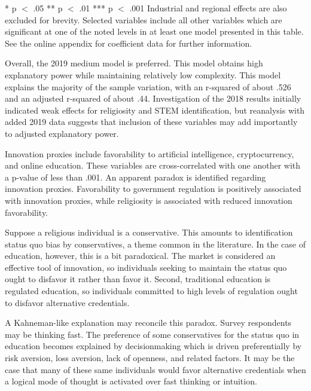 \documentclass[AER]{./aea-latex-templates/AEA}
\begin{document}
\begin{table}
\begin{tabular}{lllll}
            \end{tabular}
            \begin{tablenotes}
                * p $<$ .05
                ** p $<$ .01
                *** p $<$ .001
                Industrial and regional effects are also excluded for brevity.
                Selected variables include all other variables which are significant at one of the noted levels in at least one model presented in this table.
                See the online appendix for coefficient data for further information.
            \end{tablenotes}
            \label{tab:models}
            \end{table}
        
        Overall, the 2019 medium model is preferred. This model obtains high explanatory power while maintaining relatively low complexity.
        This model explains the majority of the sample variation, with an r-squared of about .526 and an adjusted r-squared of about .44.
        Investigation of the 2018 results initially indicated weak effects for religiosity and STEM identification,
        but reanalysis with added 2019 data suggests that inclusion of these variables may add importantly to adjusted explanatory power.
        
        Innovation proxies include favorability to artificial
        intelligence, cryptocurrency, and online education. These variables are
        cross-correlated with one another with a p-value of less than .001.
        An apparent paradox is identified regarding innovation proxies.
        Favorability to government regulation is positively associated with
        innovation proxies, while religiosity is associated with reduced
        innovation favorability.
        
        Suppose a religious individual is a conservative.
        This amounts to identification status quo bias
        by conservatives, a theme common in the literature\cite{eidelman2012bias}.
        In the case of education, however, this is a bit paradoxical.
        The market is considered an effective tool of innovation\cite{baumol2002free},
        so individuals seeking to maintain the status quo ought to disfavor it rather than favor it.
        Second, traditional education is regulated education,
        so individuals committed to high levels of regulation ought to disfavor
        alternative credentials.

        A Kahneman-like explanation may reconcile this paradox.
        Survey respondents may be thinking fast\cite{kahneman2011thinking}.
        The preference of some conservatives for the status quo in education becomes explained by
        decisionmaking which is driven preferentially by
        risk aversion, loss aversion, lack of openness, and related factors.
        It may be the case that many of these same individuals would favor alternative
        credentials when a logical mode of thought is activated over fast thinking or intuition.
        
\end{document}
